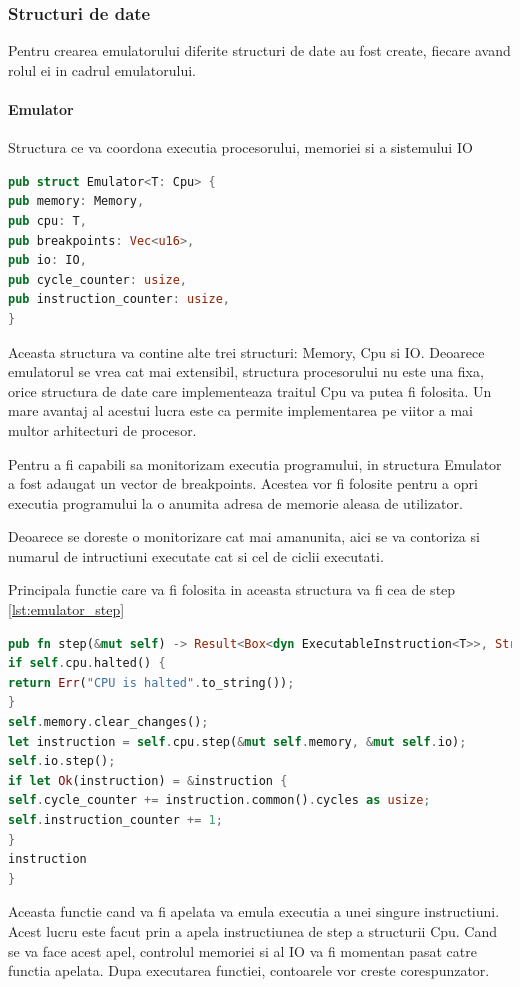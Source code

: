 \documentclass[titlepage,12pt]{article}
\begin{document}
\subsubsection{Structuri de date}

Pentru crearea emulatorului diferite structuri de date au fost create, fiecare avand rolul ei in cadrul emulatorului.

\paragraph{Emulator} Structura ce va coordona executia procesorului, memoriei si a sistemului IO

\begin{lstlisting}[language=Rust,caption={Structura Emulator},label={lst:emulator_struct}]
pub struct Emulator<T: Cpu> {
pub memory: Memory,
pub cpu: T,
pub breakpoints: Vec<u16>,
pub io: IO,
pub cycle_counter: usize,
pub instruction_counter: usize,
}
\end{lstlisting}

Aceasta structura va contine alte trei structuri: Memory, Cpu si IO. Deoarece emulatorul se vrea cat mai extensibil, structura procesorului nu este una fixa, orice structura de date care implementeaza traitul Cpu va putea fi folosita. Un mare avantaj al acestui lucra este ca permite implementarea pe viitor a mai multor arhitecturi de procesor.

Pentru a fi capabili sa monitorizam executia programului, in structura Emulator a fost adaugat un vector de breakpoints. Acestea vor fi folosite pentru a opri executia programului la o anumita adresa de memorie aleasa de utilizator.

Deoarece se doreste o monitorizare cat mai amanunita, aici se va contoriza si numarul de intructiuni executate cat si cel de ciclii executati.

Principala functie care va fi folosita in aceasta structura va fi cea de step \cref{lst:emulator_step}

\begin{lstlisting}[language=Rust,caption={Functia step a emulatorului},label={lst:emulator_step}]
pub fn step(&mut self) -> Result<Box<dyn ExecutableInstruction<T>>, String> {
if self.cpu.halted() {
return Err("CPU is halted".to_string());
}
self.memory.clear_changes();
let instruction = self.cpu.step(&mut self.memory, &mut self.io);
self.io.step();
if let Ok(instruction) = &instruction {
self.cycle_counter += instruction.common().cycles as usize;
self.instruction_counter += 1;
}
instruction
}
\end{lstlisting}
Aceasta functie cand va fi apelata va emula executia a unei singure instructiuni. Acest lucru este facut prin a apela instructiunea de step a structurii Cpu. Cand se va face acest apel, controlul memoriei si al IO va fi momentan pasat catre functia apelata. Dupa executarea functiei, contoarele vor creste corespunzator.
\end{document}
